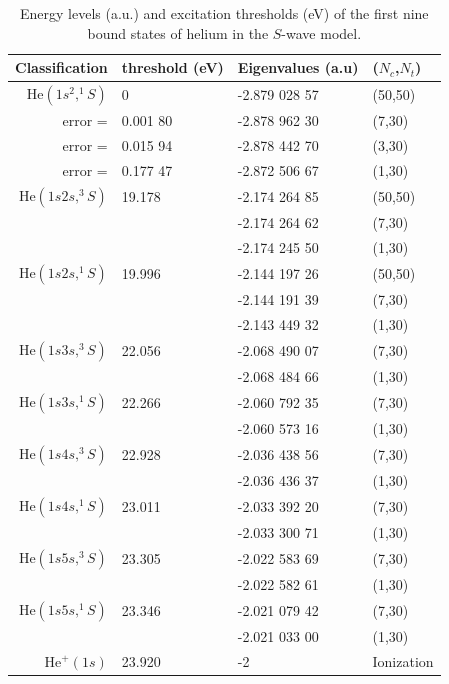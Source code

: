\documentclass[aip
, pra
, showpacs
, aps
, twocolumn
, groupedaddress
, floatfix
]{revtex4}
\begin{document}
\begin{table}[htb]
\caption{\label{Tab_ENGS}
Energy levels (a.u.) and excitation thresholds (eV) of the first nine bound states of helium in the
$S$-wave model.
}
\begin{ruledtabular}
\begin{tabular}{rlll}
Classification & threshold (eV) & Eigenvalues (a.u) & ($N_c$,$N_t$)   \\
\hline
$\mbox{He}(1s^2,^1S)$ & 0  & -2.879 028 57  &  (50,50)   \\ %
            error =   & 0.001 80 & -2.878 962 30   &  (7,30)    \\
            error =   & 0.015 94 & -2.878 442 70   &  (3,30)    \\
            error =   & 0.177 47 & -2.872 506 67   &  (1,30)    \\
\hline
$\mbox{He}(1s2s,^3S)$   & 19.178  & -2.174 264 85  & (50,50) \\  %
                 &  & -2.174 264 62   &  (7,30)   \\
                &  & -2.174 245 50   &  (1,30)    \\
\hline
$\mbox{He}(1s2s,^1S)$     &  19.996 & -2.144 197 26  &  (50,50) \\ %
                          &  & -2.144 191 39   &  (7,30)   \\
                          &   & -2.143 449 32   &  (1,30)    \\
\hline
$\mbox{He}(1s3s,^3S)$     & 22.056  & -2.068 490 07   &  (7,30)   \\
                          &        & -2.068 484 66   &  (1,30)    \\
\hline
$\mbox{He}(1s3s,^1S)$     & 22.266   & -2.060 792 35   & (7,30)    \\
                          &          & -2.060 573 16   &  (1,30)    \\
\hline
$\mbox{He}(1s4s,^3S)$    & 22.928  & -2.036 438 56  &  (7,30)    \\
                         &         & -2.036 436 37   &  (1,30)   \\
\hline
$\mbox{He}(1s4s,^1S)$   &  23.011 & -2.033 392 20 &  (7,30)   \\
                        &         & -2.033 300 71 &  (1,30)   \\
\hline
$\mbox{He}(1s5s,^3S)$   &   23.305  & -2.022 583 69   &  (7,30)    \\
                        &           & -2.022 582 61   &  (1,30)    \\
\hline
$\mbox{He}(1s5s,^1S)$   &  23.346   & -2.021 079 42   &  (7,30)    \\
                        &           & -2.021 033 00   &  (1,30)    \\
\hline
$\mbox{He}^+(1s)$       &  23.920 & -2 	 &    Ionization \\


\end{tabular}
\end{ruledtabular}
\end{table}
\end{document}
